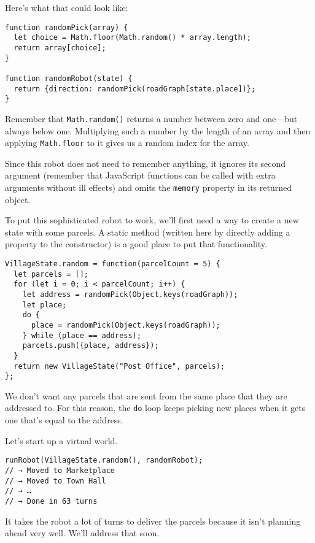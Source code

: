 Here's what that could look like:

\begin{lstlisting}
function randomPick(array) {
  let choice = Math.floor(Math.random() * array.length);
  return array[choice];
}

function randomRobot(state) {
  return {direction: randomPick(roadGraph[state.place])};
}
\end{lstlisting}
\noindent{}

Remember that \lstinline`Math.random()` returns a number between zero and one—but always below one. Multiplying such a number by the length of an array and then applying \lstinline`Math.floor` to it gives us a random index for the array.

Since this robot does not need to remember anything, it ignores its second argument (remember that JavaScript functions can be called with extra arguments without ill effects) and omits the \lstinline`memory` property in its returned object.

To put this sophisticated robot to work, we'll first need a way to create a new state with some parcels. A static method (written here by directly adding a property to the constructor) is a good place to put that functionality.

\begin{lstlisting}
VillageState.random = function(parcelCount = 5) {
  let parcels = [];
  for (let i = 0; i < parcelCount; i++) {
    let address = randomPick(Object.keys(roadGraph));
    let place;
    do {
      place = randomPick(Object.keys(roadGraph));
    } while (place == address);
    parcels.push({place, address});
  }
  return new VillageState("Post Office", parcels);
};
\end{lstlisting}
\noindent{}

We don't want any parcels that are sent from the same place that they are addressed to. For this reason, the \lstinline`do` loop keeps picking new places when it gets one that's equal to the address.

Let's start up a virtual world.

\begin{lstlisting}
runRobot(VillageState.random(), randomRobot);
// → Moved to Marketplace
// → Moved to Town Hall
// → …
// → Done in 63 turns
\end{lstlisting}
\noindent

It takes the robot a lot of turns to deliver the parcels because it isn't planning ahead very well. We'll address that soon.

